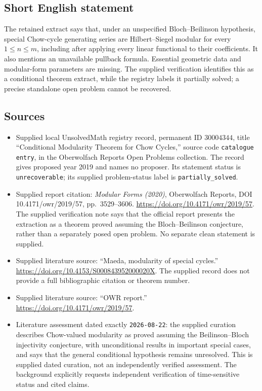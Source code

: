 \documentclass[11pt]{article}
\begin{document}
\subsection{Short English statement}
The retained extract says that, under an unspecified Bloch--Beilinson hypothesis, special Chow-cycle generating series are Hilbert--Siegel modular for every \(1\leq n\leq m\), including after applying every linear functional to their coefficients. It also mentions an unavailable pullback formula. Essential geometric data and modular-form parameters are missing. The supplied verification identifies this as a conditional theorem extract, while the registry labels it partially solved; a precise standalone open problem cannot be recovered.
\subsection{Sources}
\begin{itemize}
\item Supplied local UnsolvedMath registry record, permanent ID \(30004344\), title ``Conditional Modularity Theorem for Chow Cycles,'' source code \texttt{catalogue entry}, in the Oberwolfach Reports Open Problems collection. The record gives proposed year 2019 and names no proposer. Its statement status is \texttt{unrecoverable}; its supplied problem-status label is \texttt{partially\_solved}.
\item Supplied report citation: \emph{Modular Forms (2020)}, Oberwolfach Reports, DOI 10.4171/owr/2019/57, pp.\ 3529--3606. \url{https://doi.org/10.4171/owr/2019/57}. The supplied verification note says that the official report presents the extraction as a theorem proved assuming the Bloch--Beilinson conjecture, rather than a separately posed open problem. No separate clean statement is supplied.
\item Supplied literature source: ``Maeda, modularity of special cycles.'' \url{https://doi.org/10.4153/S000843952000020X}. The supplied record does not provide a full bibliographic citation or theorem number.
\item Supplied literature source: ``OWR report.'' \url{https://doi.org/10.4171/owr/2019/57}.
\item Literature assessment dated exactly \texttt{2026-08-22}: the supplied curation describes Chow-valued modularity as proved assuming the Beilinson--Bloch injectivity conjecture, with unconditional results in important special cases, and says that the general conditional hypothesis remains unresolved. This is supplied dated curation, not an independently verified assessment. The background explicitly requests independent verification of time-sensitive status and cited claims.
\end{itemize}
\end{document}
